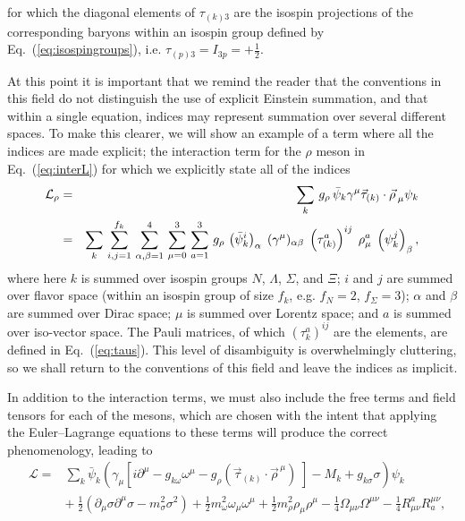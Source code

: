 \documentclass[11pt,a4paper,twoside]{carrollthesis}
\newcommand{\del}{\partial}
\newcommand{\bea}{\begin{eqnarray}}
\newcommand{\eea}{\end{eqnarray}}
\newcommand{\s}{\sigma}
\newcommand{\w}{\omega}
\newcommand{\half}{\frac{1}{2}}
\begin{document}
%
for which the diagonal elements of $\tau_{(k)3}$ are the isospin
projections of the corresponding baryons within an isospin group
defined by Eq.~(\ref{eq:isospingroups}), i.e. $\tau_{(p)3} = I_{3p} =
+\half$.\par
%
At this point it is important that we remind the reader that the
conventions in this field do not distinguish the use of explicit
Einstein summation, and that within a single equation, indices may
represent summation over several different spaces. To make this
clearer, we will show an example of a term where all the indices are
made explicit; the interaction term for the $\rho$ meson in
Eq.~(\ref{eq:interL}) for which we explicitly state all of the indices
%
\bea \nonumber {\cal L}_{\rho} &=& \sum_{k}\, g_{\rho}\, \bar{\psi}_k
\gamma^\mu \vec{\tau}_{(k)}\cdot\vec{\rho\, }_\mu \psi_k\\ &=&
\sum_k\, \sum_{i,j=1}^{f_k}\, \sum_{\alpha,\beta=1}^{4}\,
\sum_{\mu=0}^{3}\, \sum_{a=1}^{3}\, g_{\rho}\,
\left(\bar{\psi}^i_k\right)_\alpha\; (\gamma^\mu)_{\alpha \beta}\;
\left(\tau_{(k)}^a\right)^{ij}\; \rho^a_\mu\;
\left(\psi_k^{j}\right)_\beta,\eea
%
where here $k$ is summed over isospin groups $N$, $\Lambda$, $\Sigma$,
and $\Xi$; $i$ and $j$ are summed over flavor space (within an isospin
group of size $f_k$, e.g. $f_N = 2$, $f_\Sigma = 3$); $\alpha$ and
$\beta$ are summed over Dirac space; $\mu$ is summed over Lorentz
space; and $a$ is summed over iso-vector space. The Pauli matrices, of
which $\left(\tau_k^a\right)^{ij}$ are the elements, are defined in
Eq.~(\ref{eq:taus}). This level of disambiguity is overwhelmingly
cluttering, so we shall return to the conventions of this field and
leave the indices as implicit.\par
%
In addition to the interaction terms, we must also include the free
terms and field tensors for each of the mesons, which are chosen with
the intent that applying the Euler--Lagrange equations to these terms
will produce the correct phenomenology, leading to
%
\bea \nonumber &\mathcal{L} = & \sum_k
\bar{\psi}_k\left(\gamma_\mu\left[i\del^\mu-g_{k\w}\w^\mu
  -g_{\rho}(\vec{\tau}_{(k)}\cdot\vec{\rho}^{\, \mu})\; \right]
-M_k+g_{k\s}\s\right)\psi_k \\ \nonumber &&
+\ \frac{1}{2}(\partial_{\mu}\sigma\partial^{\mu}\sigma-m^{2}_{\sigma}\sigma^{2})
+\frac{1}{2}m^{2}_{\omega}\omega_{\mu}\omega^{\mu}+
\frac{1}{2}m^{2}_{\rho}\rho_{\mu}\rho^{\mu}%
-\frac{1}{4}\Omega_{\mu\nu}\Omega^{\mu\nu} -
\frac{1}{4}R^a_{\mu\nu}R_a^{\mu\nu}, \\ && \label{eq:fulllag} \eea
\end{document}
